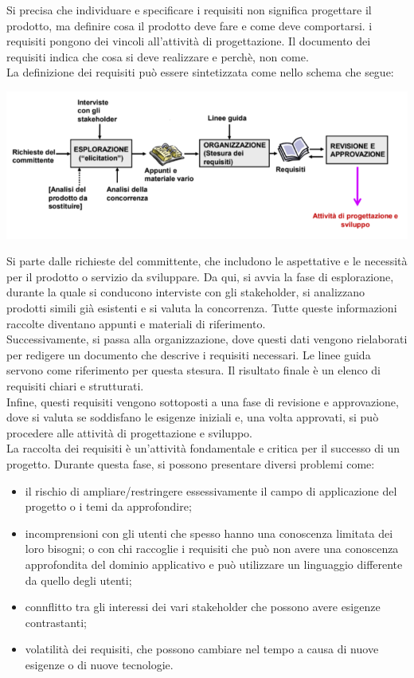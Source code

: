 \documentclass{report}
\begin{document}
	Si precisa che individuare e specificare i requisiti non significa progettare il prodotto, ma definire cosa il prodotto deve fare e come deve comportarsi. i requisiti pongono dei vincoli all'attività di progettazione. Il documento dei requisiti indica che cosa si deve realizzare e perchè, non come.
	\vspace{\baselineskip}\\
	La definizione dei requisiti può essere sintetizzata come nello schema che segue:
	\begin{center}
		\includegraphics[scale=0.5]{assets/requisiti.png}
	\end{center}
	Si parte dalle richieste del committente, che includono le aspettative e le necessità per il prodotto o servizio da sviluppare. Da qui, si avvia la fase di esplorazione, durante la quale si conducono interviste con gli stakeholder, si analizzano prodotti simili già esistenti e si valuta la concorrenza. Tutte queste informazioni raccolte diventano appunti e materiali di riferimento.
	\vspace{\baselineskip}\\
	Successivamente, si passa alla organizzazione, dove questi dati vengono rielaborati per redigere un documento che descrive i requisiti necessari. Le linee guida servono come riferimento per questa stesura. Il risultato finale è un elenco di requisiti chiari e strutturati.
	\vspace{\baselineskip}\\
	Infine, questi requisiti vengono sottoposti a una fase di revisione e approvazione, dove si valuta se soddisfano le esigenze iniziali e, una volta approvati, si può procedere alle attività di progettazione e sviluppo.
	\vspace{\baselineskip}\\
	La raccolta dei requisiti è un'attività fondamentale e critica per il successo di un progetto. Durante questa fase, si possono presentare diversi problemi come:
	\begin{itemize}
		\item il rischio di ampliare/restringere essessivamente il campo di applicazione del progetto o i temi da approfondire;
		\item incomprensioni con gli utenti che spesso hanno una conoscenza limitata dei loro bisogni; o con chi raccoglie i requisiti che può non avere una conoscenza approfondita del dominio applicativo e può utilizzare un linguaggio differente da quello degli utenti;
		\item connflitto tra gli interessi dei vari stakeholder che possono avere esigenze contrastanti;
		\item volatilità dei requisiti, che possono cambiare nel tempo a causa di nuove esigenze o di nuove tecnologie.
	\end{itemize}
\end{document}
